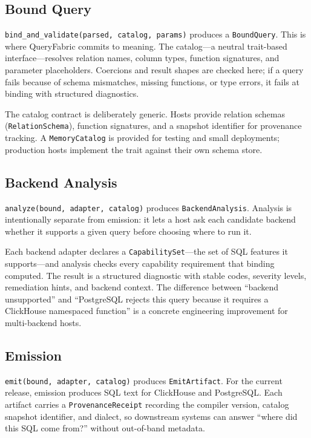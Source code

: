 \documentclass[11pt,a4paper]{article}
\begin{document}
\subsection{Bound Query}
\label{sec:bind}

\texttt{bind\_and\_validate(parsed, catalog, params)} produces a
\texttt{BoundQuery}.
This is where QueryFabric commits to meaning.
The catalog---a neutral trait-based interface---resolves relation names,
column types, function signatures, and parameter placeholders.
Coercions and result shapes are checked here; if a query fails because of
schema mismatches, missing functions, or type errors, it fails at binding
with structured diagnostics.

The catalog contract is deliberately generic.
Hosts provide relation schemas (\texttt{RelationSchema}), function signatures,
and a snapshot identifier for provenance tracking.
A \texttt{MemoryCatalog} is provided for testing and small deployments;
production hosts implement the trait against their own schema store.

\subsection{Backend Analysis}
\label{sec:analysis}

\texttt{analyze(bound, adapter, catalog)} produces \texttt{BackendAnalysis}.
Analysis is intentionally separate from emission: it lets a host ask each
candidate backend whether it supports a given query before choosing where to
run it.

Each backend adapter declares a \texttt{CapabilitySet}---the set of SQL
features it supports---and analysis checks every capability requirement
that binding computed.
The result is a structured diagnostic with stable codes, severity levels,
remediation hints, and backend context.
The difference between ``backend unsupported'' and ``PostgreSQL rejects this
query because it requires a ClickHouse namespaced function'' is a concrete
engineering improvement for multi-backend hosts.

\subsection{Emission}
\label{sec:emit}

\texttt{emit(bound, adapter, catalog)} produces \texttt{EmitArtifact}.
For the current release, emission produces SQL text for ClickHouse and
PostgreSQL.
Each artifact carries a \texttt{ProvenanceReceipt} recording the compiler
version, catalog snapshot identifier, and dialect, so downstream systems
can answer ``where did this SQL come from?'' without out-of-band metadata.
\end{document}
